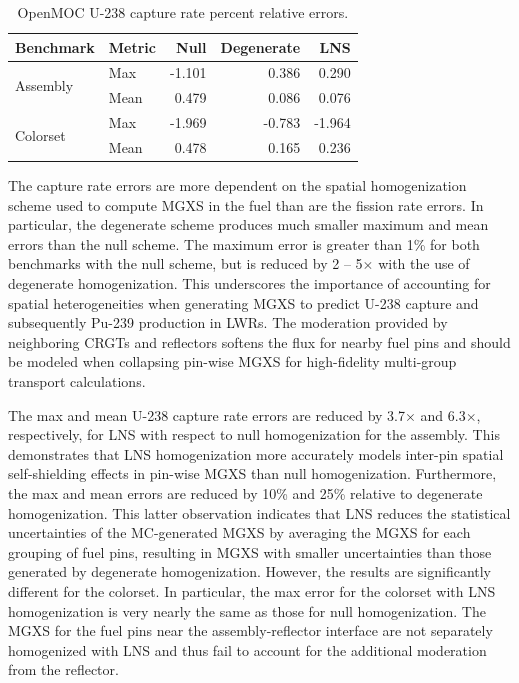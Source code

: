 \begin{table}[h!]
  \centering
  \caption{OpenMOC U-238 capture rate percent relative errors.}
  \label{tab:capt-errors} 
  \begin{tabular}{l l r r r}
  \toprule
  \textbf{Benchmark} & \textbf{Metric} & \textbf{Null} & \textbf{Degenerate} & \textbf{LNS} \\
  \midrule
  \multirow{2}{*}{Assembly} & Max  & -1.101 &  0.386 & 0.290 \\
                            & Mean &  0.479 &  0.086 & 0.076 \\
  \midrule
  \multirow{2}{*}{Colorset} & Max  & -1.969 & -0.783 & -1.964 \\
                            & Mean &  0.478 &  0.165 & 0.236 \\
  \bottomrule
\end{tabular}
\end{table}

The capture rate errors are more dependent on the spatial homogenization scheme used to compute MGXS in the fuel than are the fission rate errors. In particular, the degenerate scheme produces much smaller maximum and mean errors than the null scheme. The maximum error is greater than 1\% for both benchmarks with the null scheme, but is reduced by 2 -- 5$\times$ with the use of degenerate homogenization. This underscores the importance of accounting for spatial heterogeneities when generating MGXS to predict U-238 capture and subsequently Pu-239 production in LWRs. The moderation provided by neighboring CRGTs and reflectors softens the flux for nearby fuel pins and should be modeled when collapsing pin-wise MGXS for high-fidelity multi-group transport calculations.

The max and mean U-238 capture rate errors are reduced by 3.7$\times$ and 6.3$\times$, respectively, for LNS with respect to null homogenization for the assembly. This demonstrates that LNS homogenization more accurately models inter-pin spatial self-shielding effects in pin-wise MGXS than null homogenization. Furthermore, the max and mean errors are reduced by 10\% and 25\% relative to degenerate homogenization. This latter observation indicates that LNS reduces the statistical uncertainties of the MC-generated MGXS by averaging the MGXS for each grouping of fuel pins, resulting in MGXS with smaller uncertainties than those generated by degenerate homogenization. However, the results are significantly different for the colorset. In particular, the max error for the colorset with LNS homogenization is very nearly the same as those for null homogenization. The MGXS for the fuel pins near the assembly-reflector interface are not separately homogenized with LNS and thus fail to account for the additional moderation from the reflector.

